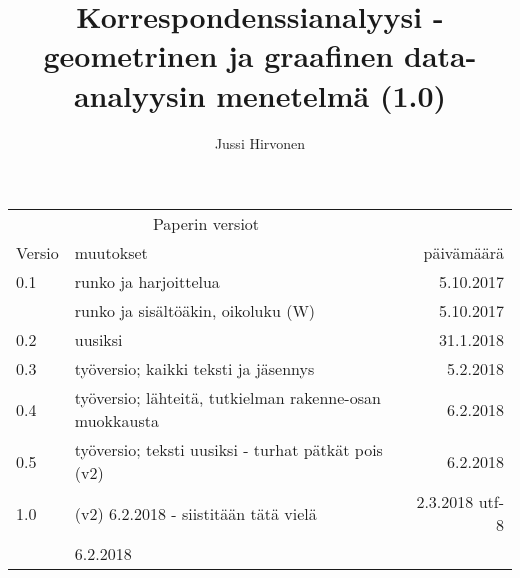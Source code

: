 \documentclass[12pt,a4paper,leqno]{article}
\title{Korrespondenssianalyysi - geometrinen ja graafinen data-analyysin menetelmä (1.0)}
\author{Jussi Hirvonen}
\date{}
\theoremstyle{plain}
\theoremstyle{definition}
\theoremstyle{remark}
\begin{document}
\maketitle

\begin{tabular}{llr}
\hline
\multicolumn{2}{c}{Paperin versiot} \\
\cline{1-2}
Versio    & muutokset & päivämäärä  \\
\hline
0.1      	& runko ja harjoittelua    & 5.10.2017     \\
        	& runko ja sisältöäkin, oikoluku (W)       & 5.10.2017     \\
0.2     	& uusiksi  & 31.1.2018     \\
0.3       & työversio; kaikki teksti ja jäsennys    & 5.2.2018      \\
0.4       & työversio; lähteitä, tutkielman rakenne-osan muokkausta    & 6.2.2018      \\
0.5       & työversio; teksti uusiksi - turhat pätkät pois (v2)  & 6.2.2018      \\
1.0       &  (v2) 6.2.2018  - siistitään tätä vielä & 2.3.2018  utf-8    \\



   & 6.2.2018      \\
\hline
\end{tabular}

\tableofcontents









% 




	
\end{document}
